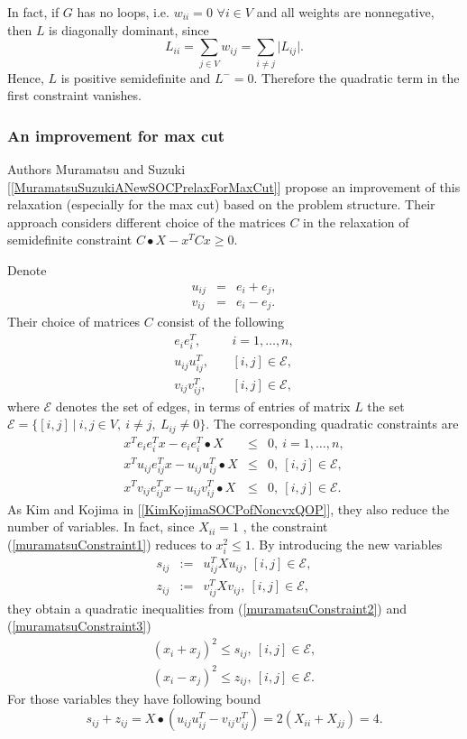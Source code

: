 \documentclass[12pt]{book}
\theoremstyle{definition}
\begin{document}
In fact, if $G$ has no loops, i.e. $w_{ii} = 0$ $\forall i\in V$ and all weights are nonnegative, then $L$ is diagonally dominant, since
$$L_{ii} = \sum_{j\in V} w_{ij} = \sum_{i\neq j} \vert L_{ij} \vert. $$
Hence, $L$ is positive semidefinite and $L^-=0.$ Therefore the quadratic term in the first constraint vanishes.



\subsubsection{An improvement for max cut}
Authors Muramatsu and Suzuki [\ref{MuramatsuSuzukiANewSOCPrelaxForMaxCut}]
propose an improvement of this relaxation (especially for the max cut) based on the problem structure. Their approach considers different choice of the matrices $C$ in the relaxation of semidefinite constraint $C\bullet X - x^TCx \geq 0$.

Denote 
\begin{eqnarray*}
u_{ij} &=& e_i + e_j, \\
v_{ij} &=& e_i - e_j.
\end{eqnarray*}
Their choice of matrices $C$ consist of the following 
\begin{eqnarray}
e_ie_i^T, &\ & i = 1,\dots,n, \\
u_{ij}u_{ij}^T, &\ & [i,j]\in \mathcal{E}, \\
v_{ij}v_{ij}^T, &\ & [i,j]\in \mathcal{E},
\end{eqnarray}
where $\mathcal{E}$ denotes the set of edges, in terms of entries of matrix $L$ the set $\mathcal{E} = \{[i,j] \ \vert \ i,j\in V,\ i\neq j, \ L_{ij}\neq 0\}$.
The corresponding quadratic constraints are 
\begin{eqnarray}
\label{muramatsuConstraint1}
x^Te_ie_i^Tx - e_ie_i^T\bullet X &\leq & 0, \ i = 1,\dots,n,\\ 
\label{muramatsuConstraint2}
x^Tu_{ij}e_{ij}^Tx - u_{ij}u_{ij}^T\bullet X &\leq & 0, \ [i,j]\in \mathcal{E},\\ 
\label{muramatsuConstraint3}
x^Tv_{ij}e_{ij}^Tx - u_{ij}v_{ij}^T\bullet X &\leq & 0, \ [i,j]\in \mathcal{E}. 
\end{eqnarray}
As Kim and Kojima in [\ref{KimKojimaSOCPofNoncvxQOP}], they also reduce the number of variables. In fact, since $X_{ii} = 1$ , the constraint (\ref{muramatsuConstraint1}) reduces to $x_i^2 \leq 1$.
By introducing the new variables 
\begin{eqnarray}
s_{ij} &:= & u_{ij}^TXu_{ij},\ [i,j]\in \mathcal{E}, \\ 
z_{ij} &:= & v_{ij}^TXv_{ij},\ [i,j]\in \mathcal{E}, 
\end{eqnarray}
they obtain a quadratic inequalities from (\ref{muramatsuConstraint2}) and (\ref{muramatsuConstraint3})
\begin{eqnarray}
(x_i + x_j)^2 \leq s_{ij}, \ [i,j]\in \mathcal{E}, \\
(x_i - x_j)^2 \leq z_{ij}, \ [i,j]\in \mathcal{E}. 
\end{eqnarray}
For those variables they have following bound
\begin{equation}
s_{ij} + z_{ij} = X\bullet(u_{ij}u_{ij}^T - v_{ij}v_{ij}^T) = 2(X_{ii} + X_{jj}) = 4.
\end{equation}
\end{document}
